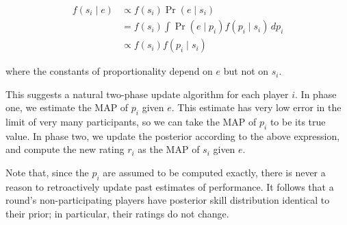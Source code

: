 \begin{align*}
f(s_i\mid e)
&\propto f(s_i)\Pr(e\mid s_i)
\\&= f(s_i)\int \Pr(e\mid p_i)f(p_i\mid s_i)\,dp_i
\\&\propto f(s_i)f(p_i\mid s_i)
\end{align*}

where the constants of proportionality depend on $e$ but not on $s_i$.

This suggests a natural two-phase update algorithm for each player $i$. In phase one, we estimate the MAP of $p_i$ given $e$. This estimate has very low error in the limit of very many participants, so we can take the MAP of $p_i$ to be its true value. In phase two, we update the posterior according to the above expression, and compute the new rating $r_i$ as the MAP of $s_i$ given $e$.

Note that, since the $p_i$ are assumed to be computed exactly, there is never a reason to retroactively update past estimates of performance. It follows that a round's non-participating players have posterior skill distribution identical to their prior; in particular, their ratings do not change.